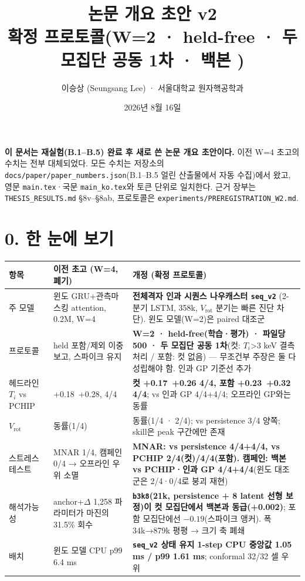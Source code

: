 \documentclass[10pt,a4paper]{article}
\title{\textbf{논문 개요 초안 v2}\\[2pt]\large 확정 프로토콜(W=2 · held-free · 두 모집단 공동 1차 · 백본 \seqv)}
\author{이승상 (Seungsang Lee) · 서울대학교 원자핵공학과}
\date{2026년 8월 16일}
\newcommand{\Ti}{\ensuremath{T_i}}
\newcommand{\Vrot}{\ensuremath{V_\mathrm{rot}}}
\newcommand{\seqv}{\texttt{seq\_v2}}
\newcommand{\bthree}{\texttt{b3k8}}
\newenvironment{banner}{\par\noindent\begin{lrbox}{\bannerbox}\begin{minipage}{0.96\linewidth}\small}{\end{minipage}\end{lrbox}\colorbox{noteg}{\usebox{\bannerbox}}\par\vspace{6pt}}
\begin{document}
\maketitle

\begin{banner}
\textbf{이 문서는 재실험(B.1–B.5) 완료 후 새로 쓴 논문 개요 초안이다.} 이전 W=4 초고의 수치는 전부 대체되었다.
모든 수치는 저장소의 \texttt{docs/paper/paper\_numbers.json}(B.1–B.5 얼린 산출물에서 자동 수집)에서 왔고,
영문 \texttt{main.tex}·국문 \texttt{main\_ko.tex}와 토큰 단위로 일치한다. 근거 장부는 \texttt{THESIS\_RESULTS.md} \S8v–\S8ab,
프로토콜은 \texttt{experiments/PREREGISTRATION\_W2.md}.
\end{banner}

\section*{0. 한 눈에 보기}
\begin{small}
\begin{tabular}{p{2.3cm}p{4.9cm}p{8.0cm}}
\toprule
항목 & 이전 초고 (W=4, 폐기) & \textbf{개정 (확정 프로토콜)} \\
\midrule
주 모델 & 윈도 GRU+관측마스킹 attention, 0.2M, W=4 & \textbf{전체격자 인과 시퀀스 나우캐스터 \seqv} (2-분기 LSTM, 358k, \Vrot{} 분기는 빠른 진단 차단). 윈도 모델(W=2)은 paired 대조군 \\
프로토콜 & held 포함/제외 이중 보고, 스파이크 유지 & \textbf{W=2 · held-free(학습·평가) · 파일당 500 · 두 모집단 공동 1차}(컷: \Ti{}>3 keV 결측 처리 / 포함: 컷 없음) — 무조건부 주장은 둘 다 성립해야 함. 인과 GP 기준선 추가 \\
헤드라인 \Ti{} vs PCHIP & +0.18~+0.28, 4/4 & \textbf{컷 +0.17~+0.26 4/4, 포함 +0.23~+0.32 4/4}; vs 인과 GP 4/4+4/4; 오프라인 GP와는 동률 \\
\Vrot{} & 동률(1/4) & 동률(1/4 · 2/4); vs persistence 3/4 양쪽; skill은 peak 구간에만 존재 \\
스트레스 테스트 & MNAR 1/4, 캠페인 0/4 → 오프라인 우위 소멸 & \textbf{MNAR: vs persistence 4/4+4/4, vs PCHIP 2/4(컷)/4/4(포함). 캠페인: 백본 vs PCHIP·인과 GP 4/4+4/4}(윈도 대조군은 2/4·0/4로 붕괴 재현) \\
해석가능성 & anchor+$\Delta$ 1,258 파라미터가 마진의 31.5\% 회수 & \textbf{\bthree{}(21k, persistence + 8 latent 선형 보정)이 컷 모집단에서 백본과 동급(+0.002)}; 포함 모집단에선 $-0.19$(스파이크 앵커). 폭 34k→879k 평평 → 크기 축 폐쇄 \\
배치 & 윈도 모델 CPU p99 6.4 ms & \textbf{\seqv{} 상태 유지 1-step CPU 중앙값 1.05 ms / p99 1.61 ms}; conformal 32/32 셀 우위 \\
\bottomrule
\end{tabular}
\end{small}
\end{document}

